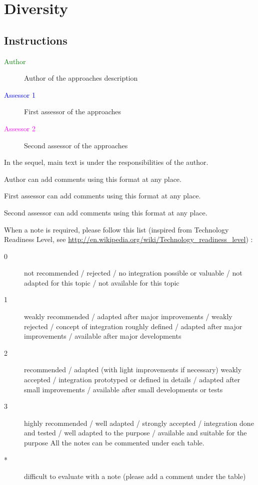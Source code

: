 \chapter{Diversity}
\label{sec:diversity}

\section{Instructions}

\begin{description}
\item[\textcolor{green}{Author}] Author of the approaches description  
\item[\textcolor{blue}{Assessor 1}] First assessor of the approaches 
\item[\textcolor{magenta}{Assessor 2}] Second assessor of the approaches 
\end{description}

In the sequel, main text is under the responsibilities of the author.

\begin{author_comment}
Author can add comments using this format at any place.
\end{author_comment}

\begin{assessor1}
First assessor can add comments using this format at any place.
\end{assessor1}

\begin{assessor2}
Second assessor can add comments using this format at any place.
\end{assessor2}

When a note is required, please follow this list (inspired from Technology Readiness Level, see \url{http://en.wikipedia.org/wiki/Technology\_readiness\_level}) :

\begin{description}
\item[0] not recommended / rejected / no integration possible or valuable / not adapted for this topic / not available for this topic
\item[1] weakly recommended / adapted after major improvements / weakly rejected / concept of integration roughly defined / adapted after major improvements / available after major developments
\item[2] recommended / adapted (with light improvements if necessary)  weakly accepted / integration prototyped or defined in details / adapted after small improvements / available after small developments or tests
\item[3] highly recommended / well adapted / strongly accepted / integration done and tested / well adapted to the purpose / available and suitable for the purpose All the notes can be commented under each table.
\item[*] difficult to evaluate with a note (please add a comment under the table)
\end{description}


